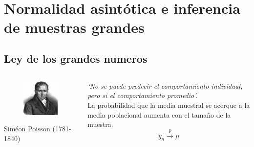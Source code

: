\section{Normalidad asintótica e inferencia de muestras grandes}

\subsection{Ley de los grandes numeros}
\begin{frame}	
	\begin{columns}[onlytextwidth]
			\begin{column}{.45\textwidth}
				\begin{figure}
					\includegraphics[scale=0.8]{fig/simeon_poisson.jpg}
				\end{figure}
				Siméon Poisson (1781-1840)
			\end{column}
		\hfill
			\begin{column}{.45\textwidth}
				\textit{`No se puede predecir el comportamiento individual, pero si el comportamiento promedio'.}  \\ 
				\bigskip
				La probabilidad que la media muestral se acerque a la media poblacional aumenta con el tamaño de la muestra.
				$$ \bar y_n \xrightarrow{p} \mu $$
			\end{column}
	\end{columns}
\end{frame}

